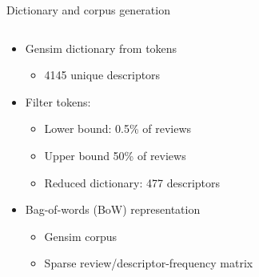 \documentclass{beamer}
\begin{document}
\begin{frame}{Dictionary and corpus generation}
\begin{columns}
\begin{column}{0.5\textwidth}
\begin{itemize}
	\item Gensim dictionary from tokens
		\begin{itemize}
		\item 4145 unique descriptors
	\end{itemize}
	\item Filter tokens: 
	\begin{itemize}
		\item Lower bound: 0.5\%  of reviews
		\item Upper bound 50\% of reviews
		\item Reduced dictionary: 477 descriptors
	\end{itemize}
	
	\item Bag-of-words (BoW) representation
		\begin{itemize}
		\item Gensim corpus
		\item Sparse review/descriptor-frequency matrix
	\end{itemize}
	

\end{itemize}
\end{column}
\end{columns}
\end{frame}
\end{document}
